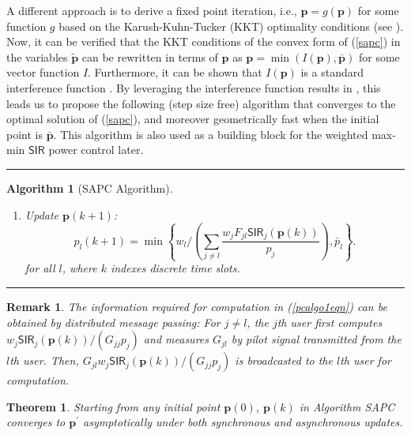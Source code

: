 \documentclass[10pt,twocolumn]{IEEEtran}
\newcommand{\0}{\mathbf{0}}
\newcommand{\1}{\mathbf{1}}
\newtheorem{theorem}{Theorem}
\newtheorem{algorithm}{Algorithm}
\newtheorem{remark}{Remark}
\begin{document}
A different approach is to derive a fixed point iteration, i.e., $\mathbf{p}=g(\mathbf{p})$ for some function $g$ based on the Karush-Kuhn-Tucker (KKT) optimality conditions (see \cite{Boyd}). Now, it can be verified that the KKT conditions of the convex form of (\ref{sapc}) in the variables $\mathbf{\tilde{p}}$ can be rewritten in terms of $\mathbf{p}$ as $\mathbf{p}=\min(I(\mathbf{p}),\mathbf{\bar{p}})$ for some vector function $I$. Furthermore, it can be shown that $I(\mathbf{p})$ is a standard interference function \cite{Yates95}. By leveraging the interference function results in \cite{Yates95}, this leads us to propose the following (step size free) algorithm that converges to the optimal solution of (\ref{sapc}), and moreover geometrically fast when the initial point is $\bar{\mathbf{p}}$. This algorithm is also used as a building block for the weighted max-min $\mathsf{SIR}$ power control later. 
\rule{0.49\textwidth}{0.1mm}
\begin{algorithm}[SAPC Algorithm]
\label{pcalgo1}
\hspace{.2in}
\begin{enumerate}
\item Update $\mathbf{p}(k+1)$:
\begin{equation}
\label{pcalgo1eqn}
p_l(k+1) = \min \left\{ w_l/\left(\sum_{j \ne l} \frac{w_j F_{jl} \mathsf{SIR}_j(\mathbf{p}(k))}{p_j } \right), \bar{p}_l \right\}.
\end{equation}
for all $l$, where $k$ indexes discrete time slots. 
\end{enumerate}
\end{algorithm}
\rule{0.49\textwidth}{0.1mm}
\begin{remark}
The information required for computation in (\ref{pcalgo1eqn}) can be obtained by distributed message passing: For $j \ne l$, the $j$th user first computes $w_j \mathsf{SIR}_j(\mathbf{p}(k))/(G_{jj}p_j)$ and measures $G_{jl}$ by pilot signal transmitted from the $l$th user. Then, $G_{jl}w_j \mathsf{SIR}_j(\mathbf{p}(k))/(G_{jj}p_j)$ is broadcasted to the $l$th user for computation.
\end{remark}

\begin{theorem}
\label{pcalgo1fixedpoint}
Starting from any initial point $\mathbf{p}(0)$, $\mathbf{p}(k)$ in Algorithm SAPC converges to $\mathbf{p^{\prime}}$ asymptotically under both synchronous and asynchronous updates.
\end{theorem}
\end{document}
